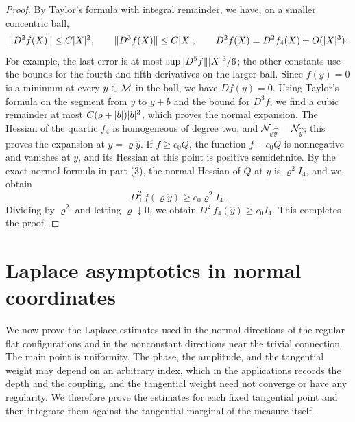 \begin{proof}
By Taylor's formula with integral remainder, we have, on a smaller concentric ball,
\[
 \lVert D^2f(X)\rVert\le C\lvert X\rvert^2,\qquad\lVert D^3f(X)\rVert\le C\lvert X\rvert,\qquad D^2f(X)=D^2f_4(X)+O(\lvert X\rvert^3).
\]
For example, the last error is at most $\sup\lVert D^5f\rVert\lvert X\rvert^3/6$; the other constants use the bounds for the fourth and fifth derivatives on the larger ball. Since $f(y)=0$ is a minimum at every $y\in\mathcal M$ in the ball, we have $Df(y)=0$. Using Taylor's formula on the segment from $y$ to $y+b$ and the bound for $D^3f$, we find a cubic remainder at most $C(\varrho+\lvert b\rvert)\lvert b\rvert^3$, which proves the normal expansion. The Hessian of the quartic $f_4$ is homogeneous of degree two, and $\mathcal N_{\varrho\widehat y}=\mathcal N_{\widehat y}$; this proves the expansion at $y=\varrho\widehat y$. If $f\ge c_0Q$, the function $f-c_0Q$ is nonnegative and vanishes at $y$, and its Hessian at this point is positive semidefinite. By the exact normal formula in part (3), the normal Hessian of $Q$ at $y$ is $\varrho^2I_4$, and we obtain
\[
 D^2_\perp f(\varrho\widehat y)\ge c_0\varrho^2I_4.
\]
Dividing by $\varrho^2$ and letting $\varrho\downarrow0$, we obtain $D^2_\perp f_4(\widehat y)\ge c_0I_4$. This completes the proof.
\end{proof}

\section{Laplace asymptotics in normal coordinates}\label{ch27:sec:laplace}

We now prove the Laplace estimates used in the normal directions of the regular flat configurations and in the nonconstant directions near the trivial connection. The main point is uniformity. The phase, the amplitude, and the tangential weight may depend on an arbitrary index, which in the applications records the depth and the coupling, and the tangential weight need not converge or have any regularity. We therefore prove the estimates for each fixed tangential point and then integrate them against the tangential marginal of the measure itself.

